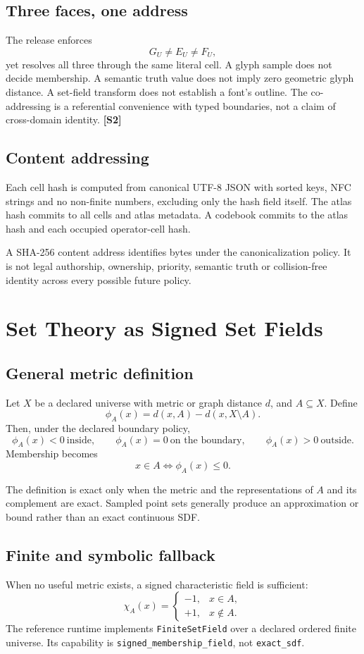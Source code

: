 \documentclass[11pt,a4paper]{article}
\newcommand{\source}[1]{\textcolor{UGTSPurple}{\textbf{[#1]}}}
\begin{document}
\subsection{Three faces, one address}
The release enforces
\[
G_U\neq E_U\neq F_U,
\]
yet resolves all three through the same literal cell. A glyph sample does not decide membership. A semantic truth value does not imply zero geometric glyph distance. A set-field transform does not establish a font's outline. The co-addressing is a referential convenience with typed boundaries, not a claim of cross-domain identity. \source{S2}

\subsection{Content addressing}
Each cell hash is computed from canonical UTF-8 JSON with sorted keys, NFC strings and no non-finite numbers, excluding only the hash field itself. The atlas hash commits to all cells and atlas metadata. A codebook commits to the atlas hash and each occupied operator-cell hash.

\begin{boundarybox}
A SHA-256 content address identifies bytes under the canonicalization policy. It is not legal authorship, ownership, priority, semantic truth or collision-free identity across every possible future policy.
\end{boundarybox}

\section{Set Theory as Signed Set Fields}
\subsection{General metric definition}
Let \(X\) be a declared universe with metric or graph distance \(d\), and \(A\subseteq X\). Define
\[
\phi_A(x)=d(x,A)-d(x,X\setminus A).
\]
Then, under the declared boundary policy,
\[
\phi_A(x)<0\ \text{inside},\qquad
\phi_A(x)=0\ \text{on the boundary},\qquad
\phi_A(x)>0\ \text{outside}.
\]
Membership becomes
\[
x\in A\iff\phi_A(x)\le 0.
\]

The definition is exact only when the metric and the representations of \(A\) and its complement are exact. Sampled point sets generally produce an approximation or bound rather than an exact continuous SDF.

\subsection{Finite and symbolic fallback}
When no useful metric exists, a signed characteristic field is sufficient:
\[
\chi_A(x)=\begin{cases}-1,&x\in A,\\+1,&x\notin A.\end{cases}
\]
The reference runtime implements \texttt{FiniteSetField} over a declared ordered finite universe. Its capability is \texttt{signed\_membership\_field}, not \texttt{exact\_sdf}.
\end{document}
